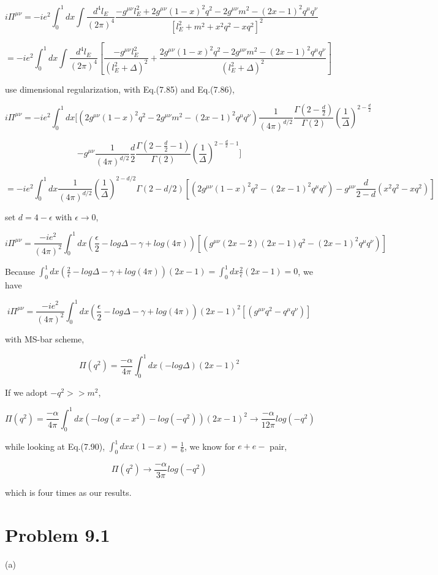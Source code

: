 \documentclass[11pt]{article} %
\begin{document}
\[ i \Pi^{\mu \nu} = -i e^2 \int^1_0 dx \int \frac{d^4 l_E}{(2\pi)^4} \frac{-g^{\mu \nu} l_E^2 + 2 g^{\mu \nu} (1-x)^2 q^2 - 2 g^{\mu \nu} m^2 - (2x-1)^2 q^\mu q^\nu}{[l_E^2 + m^2 + x^2q^2 - xq^2]^2 } \]

\[= -i e^2 \int^1_0 dx \int \frac{d^4 l_E}{(2\pi)^4} [\frac{-g^{\mu \nu} l_E^2}{(l_E^2 + \Delta)^2} + \frac{2 g^{\mu \nu} (1-x)^2 q^2 - 2 g^{\mu \nu} m^2 - (2x-1)^2 q^\mu q^\nu}{(l_E^2 + \Delta)^2}] \]

use dimensional regularization, with Eq.(7.85) and Eq.(7.86),

\[ i \Pi^{\mu \nu} = -i e^2 \int^1_0 dx [ (2 g^{\mu \nu} (1-x)^2 q^2 - 2 g^{\mu \nu} m^2 - (2x-1)^2 q^\mu q^\nu) \frac{1}{(4 \pi)^{d / 2}} \frac{\Gamma\left(2-\frac{d}{2}\right)}{\Gamma(2)}\left(\frac{1}{\Delta}\right)^{2-\frac{d}{2}} \]

\[ - g^{\mu \nu} \frac{1}{(4 \pi)^{d / 2}} \frac{d}{2} \frac{\Gamma\left(2-\frac{d}{2}-1\right)}{\Gamma(2)}\left(\frac{1}{\Delta}\right)^{2-\frac{d}{2}-1} ] \]

\[ = -i e^2 \int_0^1 dx \frac{1}{(4\pi)^{d/2}} (\frac{1}{\Delta})^{2-d/2} \Gamma(2-d/2) [ (2 g^{\mu \nu} (1-x)^2 q^2 - (2x-1)^2 q^\mu q^\nu) - g^{\mu \nu} \frac{d}{2-d} (x^2 q^2 - x q^2) ] \]

set $d = 4-\epsilon$ with $\epsilon \to 0$,

\[ i \Pi^{\mu \nu} = \frac{-i e^2}{(4\pi)^{2}} \int_0^1 dx  (\frac{\epsilon}{2} -log\Delta - \gamma + log(4\pi)) [ (g^{\mu \nu} (2x-2)(2x-1) q^2 - (2x-1)^2 q^\mu q^\nu) ] \]

Because $\int_0^1 dx  (\frac{2}{\epsilon} -log\Delta - \gamma + log(4\pi)) (2x-1) = \int_0^1 dx  \frac{2}{\epsilon} (2x-1) = 0$, we have

\[ i \Pi^{\mu \nu} = \frac{-i e^2}{(4\pi)^{2}} \int_0^1 dx  (\frac{\epsilon}{2} -log\Delta - \gamma + log(4\pi)) (2x-1)^2 [ (g^{\mu \nu} q^2 - q^\mu q^\nu) ] \]

with MS-bar scheme,

\[ \Pi(q^2) = \frac{-\alpha}{4\pi} \int_0^1 dx  (-log\Delta ) (2x-1)^2 \]

If we adopt $-q^2 >> m^2$, 

\[ \Pi(q^2) = \frac{-\alpha}{4\pi} \int_0^1 dx  (-log(x - x^2) - log(-q^2) ) (2x-1)^2  \to \frac{-\alpha}{12 \pi} log(-q^2)\]

while looking at Eq.(7.90), $\int_0^1 dx x(1-x) = \frac{1}{6}$, we know for $e+e-$ pair,

\[ \Pi(q^2) \to \frac{-\alpha}{3 \pi} log(-q^2) \]

which is four times as our results.


\section{Problem 9.1}

\noindent (a)
\end{document}
